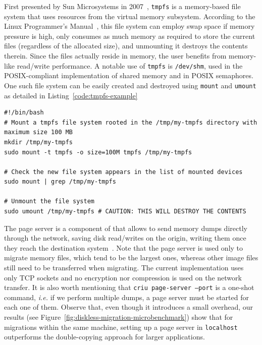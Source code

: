 First presented by Sun Microsystems in 2007~\cite{Snyder2007}, \texttt{tmpfs} is a memory-based file system that uses resources from the virtual memory subsystem.
According to the Linux Programmer's Manual~\cite{tmpfs-manpage}, this file system can employ swap space if memory pressure is high, only consumes as much memory as required to store the current files (regardless of the allocated size), and unmounting it destroys the contents therein.
Since the files actually reside in memory, the user benefits from memory-like read/write performance.
A notable use of \texttt{tmpfs} is \texttt{/dev/shm}, used in the POSIX-compliant implementation of shared memory and in POSIX semaphores.
One such file system can be easily created and destroyed using \texttt{mount} and \texttt{umount} as detailed in Listing~\ref{code:tmpfs-example}
\begin{lstlisting}[style=Bash,caption={Mounting and dismounting a \texttt{tmpfs} file system.\label{code:tmpfs-example}}]
#!/bin/bash
# Mount a tmpfs file system rooted in the /tmp/my-tmpfs directory with maximum size 100 MB
mkdir /tmp/my-tmpfs
sudo mount -t tmpfs -o size=100M tmpfs /tmp/my-tmpfs

# Check the new file system appears in the list of mounted devices
sudo mount | grep /tmp/my-tmpfs

# Unmount the file system 
sudo umount /tmp/my-tmpfs # CAUTION: THIS WILL DESTROY THE CONTENTS
\end{lstlisting}

The page server is a component of \criu that allows to send memory dumps directly through the network, saving disk read/writes on the origin, writing them once they reach the destination system~\cite{criu-page-server}.
Note that the page server is used only to migrate memory files, which tend to be the largest ones, whereas other image files still need to be transferred when migrating.
The current implementation uses only TCP sockets and no encryption nor compression is used on the network transfer.
It is also worth mentioning that \texttt{criu page-server --port} is a one-shot command, \textit{i.e.} if we perform multiple dumps, a page server must be started for each one of them.
Observe that, even though it introduces a small overhead, our results (see Figure~\ref{fig:diskless-migration-microbenchmark}) show that for migrations within the same machine, setting up a page server in \texttt{localhost} outperforms the double-copying approach for larger applications.

